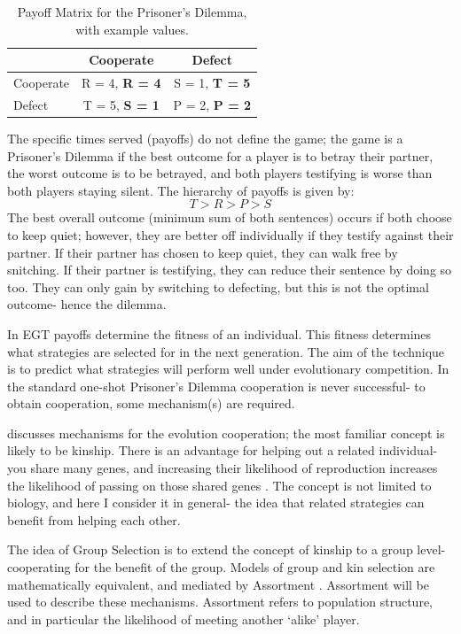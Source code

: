 \documentclass[a4paper,11pt]{article}
\begin{document}
\begin{table}[h]\centering
\captionsetup{justification=centering}
\begin{tabular}{|l|c|c|}
\hline
 & \bf{Cooperate} & \bf{Defect}\\
\hline
Cooperate & R = 4, \bf{R = 4} & S = 1, \bf{T = 5}\\
\hline
Defect & T = 5, \bf{S = 1}  & P = 2, \bf{P = 2} \\
\hline
\end{tabular}
\caption{Payoff Matrix for the Prisoner's Dilemma, with example values.}
\label{table:payoffs}
\end{table}

The specific times served (payoffs) do not define the game; the game is a Prisoner's Dilemma if the best outcome for a player is to betray their partner, the worst outcome is to be betrayed, and both players testifying is worse than both players staying silent. The hierarchy of payoffs is given by:
\begin{equation}
T>R>P>S
\end{equation}
The best overall outcome (minimum sum of both sentences) occurs if both choose to keep quiet; however, they are better off individually if they testify against their partner. If their partner has chosen to keep quiet, they can walk free by snitching. 
If their partner is testifying, they can reduce their sentence by doing so too. They can only gain by switching to defecting, but this is not the optimal outcome- hence the dilemma.

In EGT payoffs determine the fitness of an individual. This fitness determines what strategies are selected for in the next generation. The aim of the technique is to predict what strategies will perform well under evolutionary competition. In the standard one-shot Prisoner's Dilemma cooperation is never successful- to obtain cooperation, some mechanism(s) are required. 

\citet{nowak:Science:2006} discusses mechanisms for the evolution cooperation; the most familiar concept is likely to be kinship. 
There is an advantage for helping out a related individual- you share many genes, and increasing their likelihood of reproduction increases the likelihood of passing on those shared genes \citep{hamilton1964genetical}. 
The concept is not limited to biology, and here I consider it in general- the idea that related strategies can benefit from helping each other. 

The idea of Group Selection is to extend the concept of kinship to a group level- cooperating for the benefit of the group. 
Models of group and kin selection are mathematically equivalent, and mediated by Assortment \citep{traulsen2010mathematics}. 
Assortment will be used to describe these mechanisms. Assortment refers to population structure, and in particular the likelihood of meeting another `alike' player. 
\end{document}

